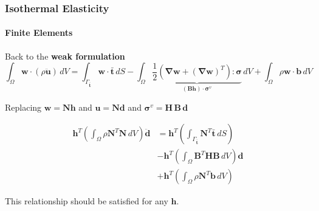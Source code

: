 \documentclass[10pt,xcolor=pdftex,dvipsnames,table]{beamer}
\begin{document}
\begin{frame}
	\frametitle{ Isothermal Elasticity }
	\framesubtitle{ Finite Elements }
	
	Back to the \textbf{weak formulation}
	\begin{equation*}
		\int_{\Omega} \boldsymbol{w}\cdot \left( \rho \ddot{\boldsymbol{u}} \right)\, dV 
		= 
		\int_{\Gamma_{\bar{\boldsymbol{t}}}} \boldsymbol{w}\cdot \boldsymbol{\bar{t}}\, dS
		- \int_{\Omega} 
		\underbrace{\frac{1}{2} \left( \boldsymbol{\nabla}\boldsymbol{w} + (\boldsymbol{\nabla}\boldsymbol{w})^T \right) 
		: \boldsymbol{\sigma}}_{(\mathbf{B}\boldsymbol{h})\cdot\boldsymbol{\sigma}^v }\, dV		
		+ \int_{\Omega} \rho \boldsymbol{w} \cdot \boldsymbol{b}\, dV
	\end{equation*}	
	
	
	Replacing $\boldsymbol{w}=\mathbf{N}\boldsymbol{h}$ and $\boldsymbol{u}=\mathbf{N}\boldsymbol{d}$ and $\boldsymbol{\sigma}^v = \mathbf{H}\,\mathbf{B}\,\boldsymbol{d}$	
	
	
	\begin{equation*}
		\begin{aligned}
			\boldsymbol{h}^T \left( \int_{\Omega} \rho \mathbf{N}^T\mathbf{N}\, dV\right) \ddot{\boldsymbol{d}}
			&= 
			\boldsymbol{h}^T \left( \int_{\Gamma_{\bar{\boldsymbol{t}}}} \mathbf{N}^T\boldsymbol{\bar{t}}\, dS \right) \\
			&- \boldsymbol{h}^T \left(\int_{\Omega}\mathbf{B}^T\mathbf{H}\mathbf{B} \, dV \right) \boldsymbol{d} \\		
			&+ \boldsymbol{h}^T \left( \int_{\Omega} \rho\mathbf{N}^T\boldsymbol{b}\, dV \right)
		\end{aligned}
	\end{equation*}		
	
	This relationship should be satisfied for any $\boldsymbol{h}$.
	
\end{frame}
\end{document}
